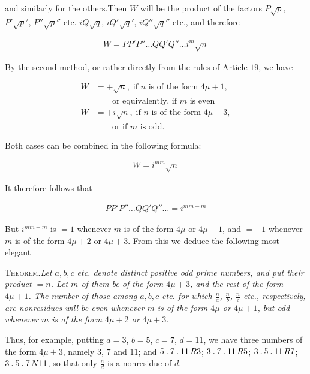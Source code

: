 and similarly for the others.\quad Then $W$ will be the product of the factors $P\surd p$, $P'\surd p'$, $P''\surd p''$ etc. $iQ\surd q$, $iQ'\surd q'$, $iQ''\surd q''$ etc., and therefore

\[
\begin{aligned}
W=PP'P''\ldots QQ'Q''\ldots i^m\surd n
\end{aligned}
\]

By the second method, or rather directly from the rules of Article $19$, we have

\[
\begin{aligned}
W&=+\surd n,\;\text{if }n\text{ is of the form }4\mu+1,\\&\qquad\text{or equivalently, if }m\text{ is even}\\
W&=+i\surd n,\;\text{if }n\text{ is of the form }4\mu+3,\\&\qquad\text{or if }m\text{ is odd.}
\end{aligned}
\]

Both cases can be combined in the following formula:

\[
\begin{aligned}
W=i^{mm}\surd n
\end{aligned}
\]

It therefore follows that

\[
\begin{aligned}
PP'P''\ldots QQ'Q''\ldots=i^{mm-m}
\end{aligned}
\]

But $i^{mm-m}$ is $=1$ whenever $m$ is of the form $4\mu$ or $4\mu+1$, and $=-1$ whenever $m$ is of the form $4\mu+2$ or $4\mu+3$. From this we deduce the following most elegant

\textsc{Theorem.}\quad \textit{Let $a,b,c$ etc. denote distinct positive odd prime numbers, and put their product $=n$. Let $m$ of them be of the form $4\mu+3$, and the rest of the form $4\mu+1$. The number of those among $a,b,c$ etc. for which $\frac{n}{a}$, $\frac{n}{b}$, $\frac{n}{c}$ etc., respectively, are nonresidues will be even whenever $m$ is of the form $4\mu$ or $4\mu+1$, but odd whenever $m$ is of the form $4\mu+2$ or $4\mu+3$.}

Thus, for example, putting $a=3$, $b=5$, $c=7$, $d=11$, we have three numbers of the form $4\mu+3$, namely $3$, $7$ and $11$; and $5\mathbin{.}7\mathbin{.}11\,R3$; $3\mathbin{.}7\mathbin{.}11\,R5$; $3\mathbin{.}5\mathbin{.}11\,R7$; $3\mathbin{.}5\mathbin{.}7\,N11$, so that only $\frac{n}{d}$ is a nonresidue of $d$.


